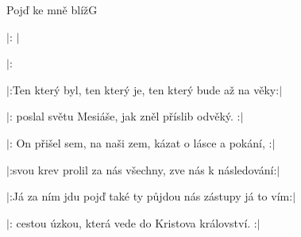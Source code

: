 \setcounter{page}{110}
\begin{song}{Pojď ke mně blíž}{G}{}

\begin{SBVerse}

$|$: $|$

$|$: 

\end{SBVerse}

\begin{SBVerse}

$|$:Ten který byl, ten který je, ten který bude až na věky:$|$

$|$: poslal světu Mesiáše, jak zněl příslib odvěký. :$|$

\end{SBVerse}

\begin{SBVerse}

$|$: On přišel sem, na naši zem, kázat o lásce a pokání, :$|$

$|$:svou krev prolil za nás všechny, zve nás k následování:$|$

\end{SBVerse}

\begin{SBVerse}

$|$:Já za ním jdu pojď také ty půjdou nás zástupy já to vím:$|$

$|$: cestou úzkou, která vede do Kristova království. :$|$

\end{SBVerse}

\end{song}
\pagebreak
